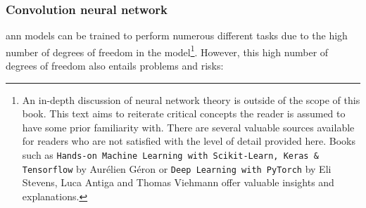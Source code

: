 \subsubsection{Convolution neural network}

\acrshort{ann} models can be trained to perform numerous different tasks due to the high number of degrees of freedom in the model\footnote{
    An in-depth discussion of neural network theory is outside of the scope of this book.
    This text aims to reiterate critical concepts the reader is assumed to have some prior familiarity with.
    There are several valuable sources available for readers who are not satisfied with the level of detail provided here.
    Books such as \texttt{Hands-on Machine Learning with Scikit-Learn, Keras \& Tensorflow} by Aurélien Géron or \texttt{Deep Learning with PyTorch} by Eli Stevens, Luca Antiga and Thomas Viehmann offer valuable insights and explanations.
}.
However, this high number of degrees of freedom also entails problems and risks:


